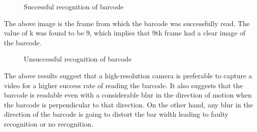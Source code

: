 \documentclass[times, 1pt, a4paper]{article}
\begin{document}
 \begin{figure}[!h] 
	\centering
	\centering
	\caption{Successful recognition of barcode}
	\label{fig:success_barcode}
	\end{figure}

The above image is the frame from which the barcode was successfully read. The value of k was found to be 9, which implies that 9th frame had a clear image of the barcode.

 \begin{figure}[!h] 
	\centering
	\centering
	\caption{Unsuccessful recognition of barcode}
	\label{fig:success_barcode}
	\end{figure}
	
	The above results suggest that a high-resolution camera is preferable to capture a video for a higher success rate of reading the barcode. It also suggests that the barcode is readable even with a considerable blur in the direction of motion when the barcode is perpendicular to that direction. On the other hand, any blur in the direction of the barcode is going to distort the bar width leading to faulty recognition or no recognition.
\end{document}
